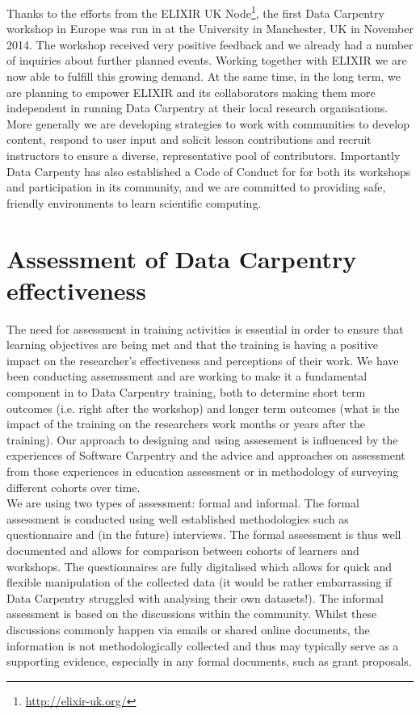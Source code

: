 \documentclass[15]{idcc}
\begin{document}
\begin{itemize}
Thanks to the efforts from the ELIXIR UK Node\footnote{\url{http://elixir-uk.org/}}, the first Data Carpentry workshop in Europe was run in at the University in Manchester, UK
in November 2014. The workshop received very positive feedback and we already had a number of inquiries about further planned events. Working together with ELIXIR we are now
able to fulfill this growing demand. At the same time, in the long term, we are planning to empower ELIXIR and its collaborators making them more independent in running
Data Carpentry at their local research organisations. \\ 

More generally we are developing strategies to work with communities to develop content, respond to user input and solicit lesson contributions and
 recruit instructors to ensure a diverse, representative pool of contributors. Importantly Data Carpenty has also established a Code of Conduct for
 for both its workshops and participation in its community, and we are committed to providing safe, friendly environments to learn scientific computing.


\section{Assessment of Data Carpentry effectiveness}
The need for assessment in training activities is essential in order to ensure that learning objectives are being met and that the
training is having a positive impact on the researcher's effectiveness and perceptions of their work. We have been conducting
assemssment and are working to make it a fundamental component in to Data Carpentry training, both to determine short term outcomes
(i.e. right after
the workshop) and longer term outcomes (what is the impact of the training on the researchers work months or years after the
training). Our approach to designing and using assesement is influenced by
the experiences of Software Carpentry and the advice and approaches on assessment from those experiences in education assessment or
in methodology of surveying different cohorts over time. \\

We are using two types of assessment: formal and informal. The formal assessment is conducted using well established
methodologies such as questionnaire and (in the future) interviews. The formal assessment is thus well documented and allows for comparison
between cohorts of learners and workshops. The questionnaires are fully digitalised which allows for quick and flexible manipulation of the
collected data (it would be rather embarrassing if Data Carpentry struggled with analysing their own datasets!). The informal assessment is
based on the discussions within the community. Whilst these discussions commonly happen via emails or shared online documents, the information
is not methodologically collected and thus may typically serve as a supporting evidence, especially in any formal documents, such as grant
proposals.\\


\end{itemize}
\end{document}
